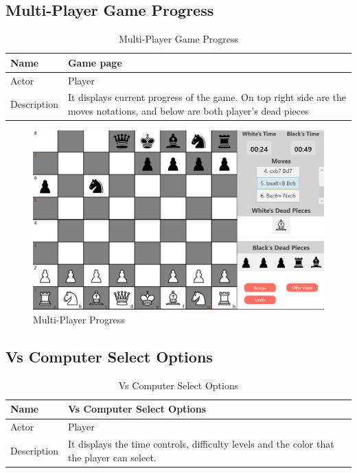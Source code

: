 \documentclass[a4paper,12pt]{article}
\begin{document}
\subsection{Multi-Player Game Progress}

\begin{longtable}{|m{}|m{}|}
    \caption{Multi-Player Game Progress} \\
    \hline
    Name & Game page \\
    \hline
    Actor & Player \\
    \hline
    Description & It displays current progress of the game. On top right side are the moves notations, and below are both player's dead pieces\\ 
    \hline
\end{longtable}

\begin{figure}[H]
    \centering
    \includegraphics[width=0.7\linewidth]{Images/Use Cases/multiplayerProgress.png}
    \caption{Multi-Player Progress}
    \label{fig:multiplayerProgress}
\end{figure}
    

\subsection{Vs Computer Select Options}

\begin{longtable}{|m{}|m{}|}
    \caption{Vs Computer Select Options} \\
    \hline
    Name & Vs Computer Select Options \\
    \hline
    Actor & Player \\
    \hline
    Description & It displays the time controls, difficulty levels and the color that the player can select.  \\ 
    \hline
\end{longtable}
\end{document}
